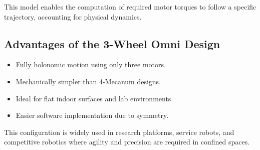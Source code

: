 \documentclass{article}
\begin{document}
This model enables the computation of required motor torques to follow a specific trajectory, accounting for physical dynamics.

\subsection{Advantages of the 3-Wheel Omni Design}

\begin{itemize}
    \item Fully holonomic motion using only three motors.
    \item Mechanically simpler than 4-Mecanum designs.
    \item Ideal for flat indoor surfaces and lab environments.
    \item Easier software implementation due to symmetry.
\end{itemize}

\noindent This configuration is widely used in research platforms, service robots, and competitive robotics where agility and precision are required in confined spaces. 
\end{document}

